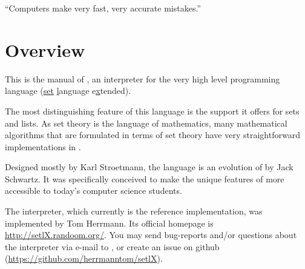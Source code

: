 


\globalDate{\today}






\begin{titlepage}
\maketitle

\vfill

\begin{center}
\Large
``Computers make very fast, very accurate mistakes.''
\end{center}

\vfill
\tableofcontents
\end{titlepage}

\section{Overview}

This is the manual of \setlX, an interpreter for the very high level programming language \SetlX{} (\underline{set} \underline{l}anguage e\underline{x}tended).

The most distinguishing feature of this language is the support it offers for sets and lists.
As set theory is the language of mathematics, many mathematical algorithms that are formulated in terms of set theory have very straightforward implementations in \SetlX{}.

Designed mostly by Karl Stroetmann, the \SetlX{} language is an evolution of \Setl{} by Jack Schwartz.
It was specifically conceived to make the unique features of \Setl{} more accessible to today's computer science students.

The \setlX{} interpreter, which currently is the \SetlX{} reference implementation, was implemented by Tom Herrmann. Its official homepage is \url{http://setlX.randoom.org/}. You may send bug-reports and\slash{}or questions about the \setlX{} interpreter via e-mail to , or create an issue on github (\url{https://github.com/herrmanntom/setlX}).

